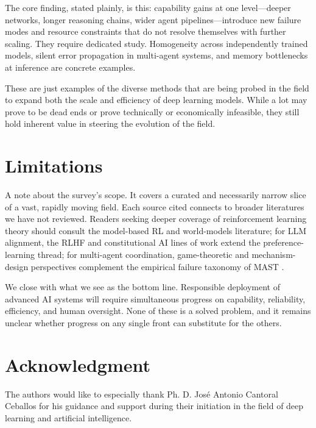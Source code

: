 \documentclass[conference]{IEEEtran}
\begin{document}
The core finding, stated plainly, is this: capability gains at one level---deeper networks, longer reasoning chains, wider agent pipelines---introduce new failure modes and resource constraints that do not resolve themselves with further scaling. They require dedicated study. Homogeneity across independently trained models, silent error propagation in multi-agent systems, and memory bottlenecks at inference are concrete examples.

These are just examples of the diverse methods that are being probed in the field to expand both the scale and efficiency of deep learning models. While a lot may prove to be dead ends or prove technically or economically infeasible, they still hold inherent value in steering the evolution of the field.

\section{Limitations}
A note about the survey's scope. It covers a curated and necessarily narrow slice of a vast, rapidly moving field. Each source cited connects to broader literatures we have not reviewed. Readers seeking deeper coverage of reinforcement learning theory should consult the model-based RL and world-models literature; for LLM alignment, the RLHF and constitutional AI lines of work extend the preference-learning thread; for multi-agent coordination, game-theoretic and mechanism-design perspectives complement the empirical failure taxonomy of MAST \cite{cemri2025multiagent}.

We close with what we see as the bottom line. Responsible deployment of advanced AI systems will require simultaneous progress on capability, reliability, efficiency, and human oversight. None of these is a solved problem, and it remains unclear whether progress on any single front can substitute for the others.

\section*{Acknowledgment}
The authors would like to especially thank Ph. D. José Antonio Cantoral Ceballos for his guidance and support during their initiation in the field of deep learning and artificial intelligence.
\end{document}
